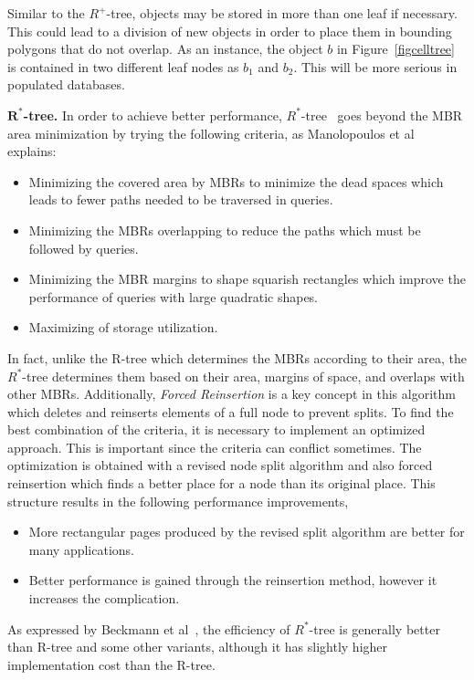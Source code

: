 \documentclass[a4paper,12pt]{article}
\begin{document}
Similar to the $R^+$-tree, objects may be stored in more than one leaf if necessary. This could lead to a division of new objects in order to place them in bounding polygons that do not overlap. 
As an instance, the object $b$ in Figure~\ref{figcelltree} is contained in two different leaf nodes as $b_1$ and $b_2$.
This will be more serious in populated databases. 

\textbf{$\boldsymbol{R^*}$-tree.}
In order to achieve better performance, $R^*$-tree~\cite{rstartree} goes beyond the MBR area minimization by trying the following criteria, as Manolopoulos et al~\cite{Manolopoulos:2005} explains:
\begin{itemize}
\item Minimizing the covered area by MBRs to minimize the dead spaces which leads to fewer paths needed to be traversed in queries. 
\item Minimizing the MBRs overlapping to reduce the paths which must be followed by queries.
\item Minimizing the MBR margins to shape squarish rectangles which improve the performance of queries with large quadratic shapes.
\item Maximizing of storage utilization. 
\end{itemize}
In fact, unlike the R-tree which determines the MBRs according to their area, the $R^*$-tree determines them based on their area, margins of space, and overlaps with other MBRs. Additionally, \textit{Forced Reinsertion} is a key concept in this algorithm which deletes and reinserts elements of a full node to prevent splits.
To find the best combination of the criteria, it is necessary to implement an optimized approach. This is important since the criteria can conflict sometimes. The optimization is obtained with a revised node split algorithm and also forced reinsertion which finds a better place for a node than its original place. This structure results in the following performance improvements,
\begin{itemize}
\item More rectangular pages produced by the revised split algorithm are better for many applications.
\item Better performance is gained through the reinsertion method, however it increases the complication.
\end{itemize}
As expressed by Beckmann et al~\cite{rstartree}, the efficiency of $R^*$-tree is generally better than R-tree and some other variants, although it has slightly higher implementation cost than the R-tree.
\end{document}
